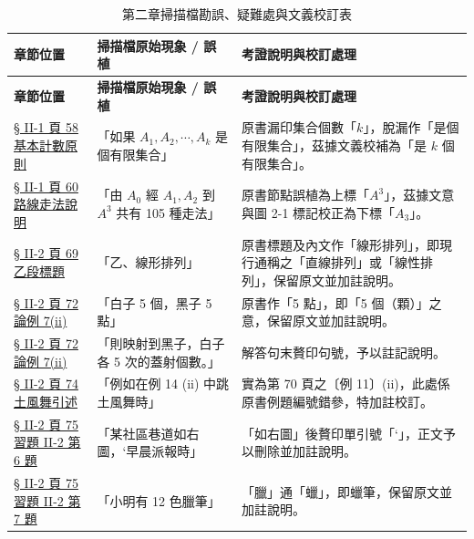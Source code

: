 \documentclass[a4paper,12pt,twoside]{article}
\begin{document}
\small
\renewcommand{\arraystretch}{1.35}
\begin{xltabular}{\textwidth}{|p{3.2cm}|p{3.8cm}|X|}
\caption{第二章掃描檔勘誤、疑難處與文義校訂表}\label{tab:errata_b5_ch2} \\
\hline
\textbf{章節位置} & \textbf{掃描檔原始現象 / 誤植} & \textbf{考證說明與校訂處理} \\ \hline
\endfirsthead
\hline
\textbf{章節位置} & \textbf{掃描檔原始現象 / 誤植} & \textbf{考證說明與校訂處理} \\ \hline
\endhead
\hline
\endfoot

\hyperref[note:b5s-ch2-p58-k]{§ II-1 頁 58 基本計數原則} & 
「如果 $A_1, A_2, \cdots, A_k$ 是個有限集合」 & 
原書漏印集合個數「$k$」，脫漏作「是個有限集合」，茲據文義校補為「是 $k$ 個有限集合」。 \\ \hline

\hyperref[note:b5s-ch2-p60-a3]{§ II-1 頁 60 路線走法說明} & 
「由 $A_0$ 經 $A_1, A_2$ 到 $A^3$ 共有 105 種走法」 & 
原書節點誤植為上標「$A^3$」，茲據文意與圖 2-1 標記校正為下標「$A_3$」。 \\ \hline

\hyperref[note:b5s-ch2-linear-perm]{§ II-2 頁 69 乙段標題} & 
「乙、線形排列」 & 
原書標題及內文作「線形排列」，即現行通稱之「直線排列」或「線性排列」，保留原文並加註說明。 \\ \hline

\hyperref[note:b5s-ch2-p72-go-stones]{§ II-2 頁 72 論例 7(ii)} & 
「白子 5 個，黑子 5 點」 & 
原書作「5 點」，即「5 個（顆）」之意，保留原文並加註說明。 \\ \hline

\hyperref[note:b5s-ch2-p72-surjection-period]{§ II-2 頁 72 論例 7(ii)} & 
「則映射到黑子，白子各 5 次的蓋射個數。」 & 
解答句末贅印句號，予以註記說明。 \\ \hline

\hyperref[note:b5s-ch2-p74-ex14]{§ II-2 頁 74 土風舞引述} & 
「例如在例 14 (ii) 中跳土風舞時」 & 
實為第 70 頁之〔例 11〕(ii)，此處係原書例題編號錯參，特加註校訂。 \\ \hline

\hyperref[note:b5s-ch2-p75-q6-quote]{§ II-2 頁 75 習題 II-2 第 6 題} & 
「某社區巷道如右圖，‘早晨派報時」 & 
「如右圖」後贅印單引號「‘」，正文予以刪除並加註說明。 \\ \hline

\hyperref[note:b5s-ch2-p75-q7-crayon]{§ II-2 頁 75 習題 II-2 第 7 題} & 
「小明有 12 色臘筆」 & 
「臘」通「蠟」，即蠟筆，保留原文並加註說明。 \\ \hline


\end{xltabular}
\end{document}
